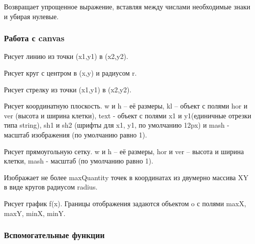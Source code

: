 
Возвращает упрощенное выражение, вставляя между числами необходимые знаки и убирая нулевые.

\subsubsection*{Работа с canvas}


Рисует линию из точки (x1,y1) в (x2,y2).


Рисует круг с центром в (x,y) и радиусом r.


Рисует стрелку из точки (x1,y1) в (x2,y2).

\hypertarget{drawCoordPlane}{
	}

Рисует координатную плоскость. w и h  \--- её размеры, kl \--- объект с полями hor и ver (высота и ширина клетки), text \-- объект с полями x1 и y1(единичные отрезки типа string), sh1 и sh2 (шрифты для x1, y1, по умолчанию 12px) и mash - масштаб изображения (по умолчанию равно 1).


Рисует прямоугольную сетку. w и h  \--- её размеры, hor и ver \--- высота и ширина клетки, mash - масштаб (по умолчанию равно 1).

\hypertarget{graph9AmarkCircles}{}

Изображает не более maxQuantity точек в координатах из двумерно массива XY в виде кругов радиусом radius.

\hypertarget{graph9AdrawFunction}{}

Рисует график f(x). Границы отображения задаются объектом o с полями maxX, maxY, minX, minY.

\subsubsection*{Вспомогательные функции}


